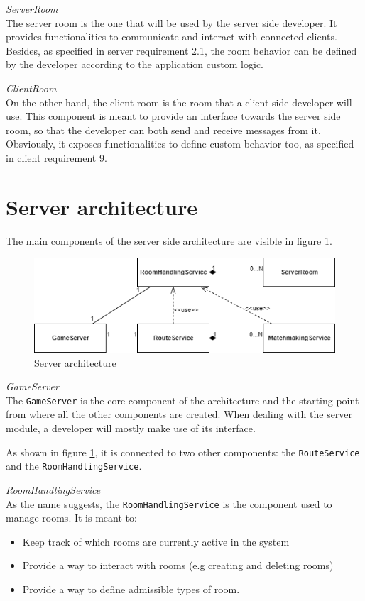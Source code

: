 \bigskip
\textit{ServerRoom}
\\
The server room is the one that will be used by the server side developer. It provides functionalities to communicate and interact with connected clients. Besides, as specified in server requirement 2.1, the room behavior can be defined by the developer according to the application custom logic.

\bigskip
\textit{ClientRoom}
\\
On the other hand, the client room is the room that a client side developer will use. This component is meant to provide an interface towards the server side room, so that the developer can both send and receive messages from it. Obsviously, it exposes functionalities to define custom behavior too, as specified in client requirement 9.

\section{Server architecture} \label{sec:server_arch}
The main components of the server side architecture are visible in figure \ref{fig:server_classes}. 

\begin{figure}[H]
	\centering
	\includegraphics[scale=0.7]{images/3-architecture/server-architecture.png}
	\caption{Server architecture}
	\label{fig:server_classes}
\end{figure}

\bigskip
\textit{GameServer}
\\
The \texttt{GameServer} is the core component of the architecture and the starting point from where all the other components are created.
When dealing with the server module, a developer will mostly make use of its interface.

As shown in figure \ref{fig:server_classes}, it is connected to two other components: the \texttt{RouteService} and the \texttt{RoomHandlingService}.

\bigskip
\textit{RoomHandlingService}
\\
As the name suggests, the \texttt{RoomHandlingService} is the component used to manage rooms. It is meant to: 
\begin{itemize}
	\item Keep track of which rooms are currently active in the system
	\item Provide a way to interact with rooms (e.g creating and deleting rooms)
	\item Provide a way to define admissible types of room.
\end{itemize}

